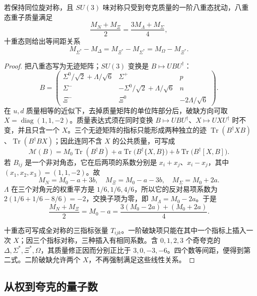 \begin{theorem}
若保持同位旋对称，且 $SU(3)$ 味对称只受到夸克质量的一阶八重态扰动，八重态重子质量满足
\begin{equation}
\frac{M_N+M_\Xi}{2}=\frac{3M_\Lambda+M_\Sigma}{4},
\label{eq:gmo-octet}
\end{equation}
十重态则给出等间距关系
\begin{equation}
M_{\Sigma^*}-M_\Delta
=M_{\Xi^*}-M_{\Sigma^*}
=M_\Omega-M_{\Xi^*}.
\label{eq:gmo-decuplet}
\end{equation}
\end{theorem}

\begin{proof}
把八重态写为无迹矩阵；$SU(3)$ 变换是 $B\mapsto UBU^\dagger$：
\[
B=\begin{pmatrix}
\Sigma^0/\sqrt2+\Lambda/\sqrt6&\Sigma^+&p\\
\Sigma^-&-\Sigma^0/\sqrt2+\Lambda/\sqrt6&n\\
\Xi^-&\Xi^0&-2\Lambda/\sqrt6
\end{pmatrix}.
\]
在 $u,d$ 质量相等的近似下，去掉质量矩阵的单位阵部分后，破缺方向可取 $X=\operatorname{diag}(1,1,-2)$。质量表达式须在同时变换 $B\mapsto UBU^\dagger$、$X\mapsto UXU^\dagger$ 时不变，并且只含一个 $X$。三个无迹矩阵的指标只能形成两种独立的迹 $\operatorname{Tr}(B^\dagger XB)$、$\operatorname{Tr}(B^\dagger BX)$；因此连同不含 $X$ 的公共质量，可写成
\[
\mathcal M(B)=M_0\operatorname{Tr}(B^\dagger B)
+a\operatorname{Tr}\!\bigl(B^\dagger\{X,B\}\bigr)
+b\operatorname{Tr}\!\bigl(B^\dagger[X,B]\bigr).
\]
若 $B_{ij}$ 是一个非对角态，它在后两项的系数分别是 $x_i+x_j$、$x_i-x_j$，其中 $(x_1,x_2,x_3)=(1,1,-2)$。故
\[
M_N=M_0-a+3b,\quad M_\Xi=M_0-a-3b,\quad
M_\Sigma=M_0+2a.
\]
$\Lambda$ 在三个对角元的权重平方是 $1/6,1/6,4/6$，所以它的反对易项系数为 $2(1/6+1/6-8/6)=-2$，交换子项为零，即 $M_\Lambda=M_0-2a$。于是
\[
\frac{M_N+M_\Xi}{2}=M_0-a
=\frac{3(M_0-2a)+(M_0+2a)}4.
\]

十重态可写成全对称的三指标张量 $T_{ijk}$。一阶破缺项只能在其中一个指标上插入一次 $X$；因三个指标对称，三种插入有相同系数。含 $0,1,2,3$ 个奇夸克的 $\Delta,\Sigma^*,\Xi^*,\Omega$，其质量修正因而分别正比于 $3,0,-3,-6$。四个数等间距，便得到第二式。二阶破缺允许两个 $X$，不再强制满足这些线性关系。
\end{proof}

\subsection{从权到夸克的量子数}

